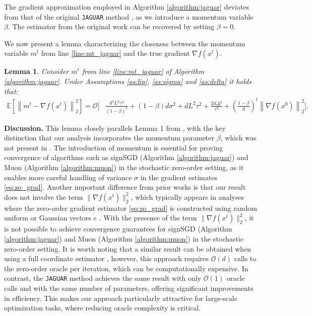 \documentclass{article}
\theoremstyle{plain}
\newtheorem{lemma}[theorem]{Lemma}
\theoremstyle{definition}
\theoremstyle{remark}
\newcommand{\expect}[1]{\mathbb{E}\left[ #1 \right]}
\newcommand{\norm}[1]{\left\| #1 \right\|}
\begin{document}
The gradient approximation employed in Algorithm \ref{algorithm:jaguar} deviates from that of the original \texttt{JAGUAR} method \cite{veprikov2024new}, as we introduce a momentum variable $\beta$. The estimator from the original work can be recovered by setting $\beta = 0$.

We now present a lemma characterizing the closeness between the momentum variable $m^t$ from line \ref{line:mt_jaguar} and the true gradient $\nabla f(x^t)$.

\begin{lemma}
    \label{lemma:mt_jaguar}
        Consider $m^t$ from line \ref{line:mt_jaguar} of Algorithm \ref{algorithm:jaguar}. Under Assumptions \ref{as:lip}, \ref{as:sigma} and \ref{as:delta} it holds that:
        \begin{align*}
            \expect{\norm{m^t\!-\!\nabla f(x^t)}_2^2}\!=\!
            \mathcal{O}\Bigg[ 
                &\frac{d^3  L^2 \gamma^2}{(1\!-\!\beta)^2}
                +
                (1\!-\!\beta)d \sigma^2
                +
                d L^2 \tau^2 
                +
                \frac{2 d \Delta^2}{\tau^2} 
                + 
                \left( \frac{1\!-\!\beta}{d} \right)^t \norm{\nabla f(x^0)}_2^2
            \Bigg] .
        \end{align*}
    \end{lemma}

\textbf{Discussion.} This lemma closely parallels Lemma 1 from \cite{veprikov2024new}, with the key distinction that our analysis incorporates the momentum parameter $\beta$, which was not present in \cite{veprikov2024new}. The introduction of momentum is essential for proving convergence of algorithms such as signSGD (Algorithm \ref{algorithm:jaguar}) and Muon (Algorithm \ref{algorithm:muon}) in the stochastic zero-order setting, as it enables more careful handling of variance $\sigma$ in the gradient estimates \eqref{eq:zo_grad}.
Another important difference from prior works is that our result does not involve the term $\|\nabla f(x^t)\|_2^2$, which typically appears in analyses where the zero-order gradient estimator \eqref{eq:zo_grad} is constructed using random uniform or Gaussian vectors $e$ \cite{gorbunov2022accelerated}. With the presence of the term $\|\nabla f(x^t)\|_2^2$, it is not possible to achieve convergence guarantees for signSGD (Algorithm \ref{algorithm:jaguar}) and Muon (Algorithm \ref{algorithm:muon}) in the stochastic zero-order setting.
It is worth noting that a similar result can be obtained when using a full coordinate estimator \cite{lian2016comprehensive}, however, this approach requires $\mathcal{O}(d)$ calls to the zero-order oracle per iteration, which can be computationally expensive. In contrast, the \texttt{JAGUAR} method achieves the same result with only $\mathcal{O}(1)$ oracle calls and with the same number of parameters, offering significant improvements in efficiency. This makes our approach particularly attractive for large-scale optimization tasks, where reducing oracle complexity is critical.
\end{document}
